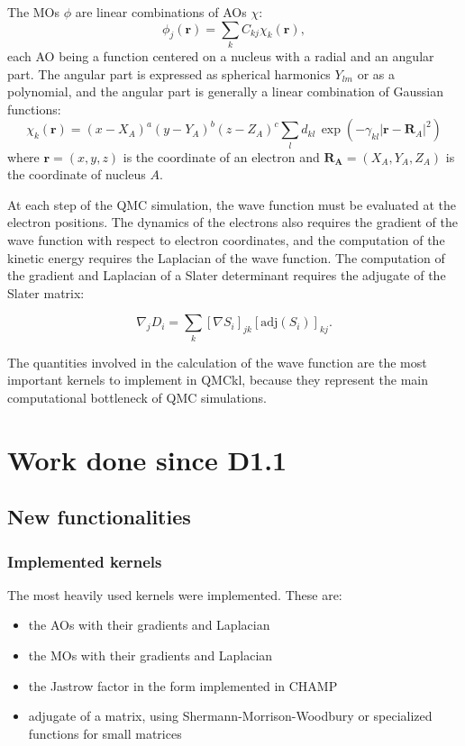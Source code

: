 The \acp{MO} $\phi$ are linear combinations of \acp{AO} $\chi$:
\begin{equation}
\phi_j(\mathbf{r}) = \sum_k C_{kj} \chi_k(\mathbf{r}),
\end{equation}
each \ac{AO} being a function centered on a nucleus with a radial and an angular part.
The angular part is expressed as spherical harmonics $Y_{lm}$ or as a polynomial, and
the angular part is generally a linear combination of Gaussian functions:
\begin{equation}
\chi_k(\mathbf{r}) = (x-X_A)^a (y-Y_A)^b (z-Z_A)^c \sum_l d_{kl}\, \exp \left(
    -\gamma_{kl} |\mathbf{r}-\mathbf{R}_A|^2 \right)
\end{equation}
where $\mathbf{r} = (x,y,z)$ is the coordinate of an electron and 
$\mathbf{R_A} = (X_A,Y_A,Z_A)$ is the coordinate of nucleus $A$.

At each step of the \ac{QMC} simulation, the wave function must be
evaluated at the electron positions. The dynamics of the electrons
also requires the gradient of the wave function with respect to electron
coordinates, and the computation of the kinetic energy requires the Laplacian
of the wave function. The computation of the gradient and Laplacian of
a Slater determinant requires the adjugate of the Slater matrix:

\begin{equation}
  \nabla_j D_i = \sum_k \left[\nabla S_i \right]_{jk} \left[\mathrm{adj}(S_i)\right]_{kj}.
\end{equation}


The quantities involved in the calculation of the wave function are the most
important kernels to implement in QMCkl, because they represent the main
computational bottleneck of \ac{QMC} simulations.


\section{Work done since D1.1}

\subsection{New functionalities}

\subsubsection{Implemented kernels}

The most heavily used kernels were implemented. These are:
\begin{itemize}
  \item the \acp{AO} with their gradients and Laplacian
  \item the \acp{MO} with their gradients and Laplacian
  \item the Jastrow factor in the form implemented in CHAMP
  \item adjugate of a matrix, using Shermann-Morrison-Woodbury or
    specialized functions for small matrices
\end{itemize}    

